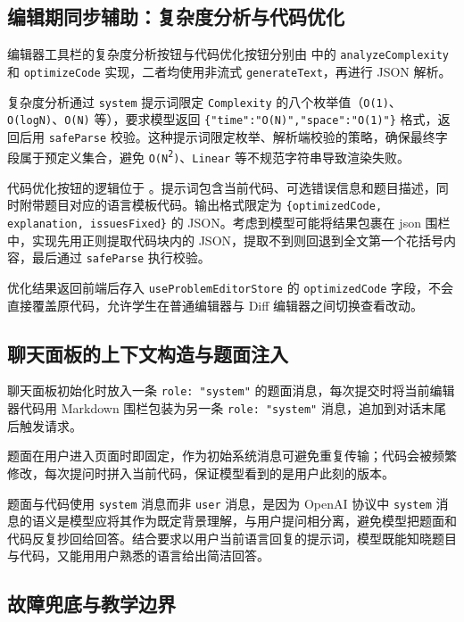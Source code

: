 \subsection{编辑期同步辅助：复杂度分析与代码优化}

编辑器工具栏的复杂度分析按钮与代码优化按钮分别由  中的 \texttt{analyzeComplexity} 和 \texttt{optimizeCode} 实现，二者均使用非流式 \texttt{generateText}，再进行 JSON 解析。

复杂度分析通过 \texttt{system} 提示词限定 \texttt{Complexity} 的八个枚举值（\texttt{O(1)}、\texttt{O(logN)}、\texttt{O(N)} 等），要求模型返回 \texttt{\{"time":"O(N)","space":"O(1)"\}} 格式，返回后用 \texttt{safeParse} 校验。这种提示词限定枚举、解析端校验的策略，确保最终字段属于预定义集合，避免 \texttt{O(N\textsuperscript{2})}、\texttt{Linear} 等不规范字符串导致渲染失败。

代码优化按钮的逻辑位于 。提示词包含当前代码、可选错误信息和题目描述，同时附带题目对应的语言模板代码。输出格式限定为 \texttt{\{optimizedCode, explanation, issuesFixed\}} 的 JSON。考虑到模型可能将结果包裹在 json 围栏中，实现先用正则提取代码块内的 JSON，提取不到则回退到全文第一个花括号内容，最后通过 \texttt{safeParse} 执行校验。

优化结果返回前端后存入 \texttt{useProblemEditorStore} 的 \texttt{optimizedCode} 字段，不会直接覆盖原代码，允许学生在普通编辑器与 Diff 编辑器之间切换查看改动。

\subsection{聊天面板的上下文构造与题面注入}

聊天面板初始化时放入一条 \texttt{role: "system"} 的题面消息，每次提交时将当前编辑器代码用 Markdown 围栏包装为另一条 \texttt{role: "system"} 消息，追加到对话末尾后触发请求。

题面在用户进入页面时即固定，作为初始系统消息可避免重复传输；代码会被频繁修改，每次提问时拼入当前代码，保证模型看到的是用户此刻的版本。

题面与代码使用 \texttt{system} 消息而非 \texttt{user} 消息，是因为 OpenAI 协议中 \texttt{system} 消息的语义是模型应将其作为既定背景理解，与用户提问相分离\cite{deepseek2024api}，避免模型把题面和代码反复抄回给回答。结合要求以用户当前语言回复的提示词，模型既能知晓题目与代码，又能用用户熟悉的语言给出简洁回答。

\subsection{故障兜底与教学边界}


